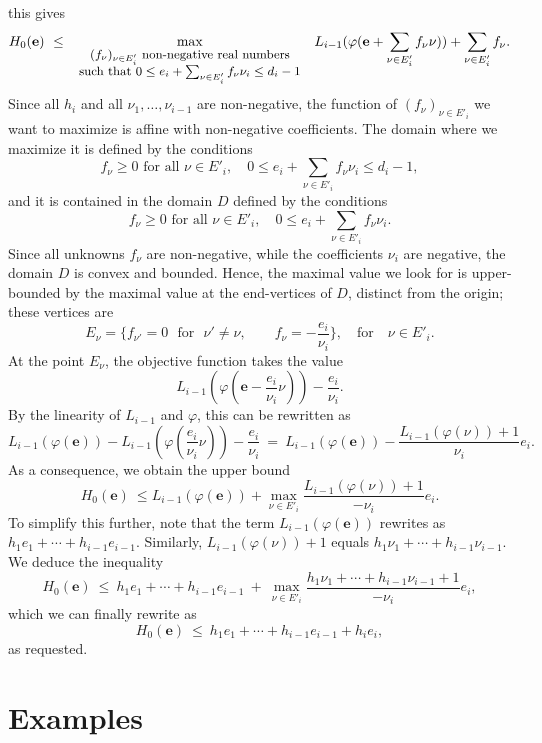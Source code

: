 \documentclass[amsthm]{elsart}
\def\e {\ensuremath{\mathbf{e}}}
\theoremstyle{plain}
\begin{document}
\begin{pf}
this gives
$$H_0(\e) \ \le \ \max_{\small
\begin{array}{c}
(f_\nu)_{\nu \in E'_i} \text{~non-negative real numbers} \\ 
\text{such~that~} 0 \le e_i + \sum_{\nu \in E'_i} f_\nu \nu_i \le d_i-1
\end{array}
}\ L_{i-1}(\varphi(\e + \sum_{\nu \in E'_i} f_\nu \nu))+\sum_{\nu \in
  E'_i} f_\nu.$$ Since all $h_i$ and all $\nu_1,\dots,\nu_{i-1}$ are
non-negative, the function of $(f_\nu)_{\nu \in E'_i}$ we want to
maximize is affine with non-negative coefficients. The domain where we
maximize it is defined by the conditions
$$f_\nu \ge 0 \text{~for all~} \nu \in E'_i, \quad 0 \le  e_i + \sum_{\nu \in E'_i}  f_\nu \nu_i \le d_i-1,$$
and it is contained in the domain $D$ defined by the conditions
$$f_\nu \ge 0 \text{~for all~} \nu \in E'_i, \quad 0 \le e_i + \sum_{\nu \in E'_i}  f_\nu \nu_i.$$
Since all unknowns $f_\nu$ are non-negative, while the coefficients
$\nu_i$ are negative, the domain $D$ is convex and bounded. Hence, the
maximal value we look for is upper-bounded by the maximal value at the
end-vertices of $D$, distinct from the origin; these vertices are 
$$E_\nu = \{f_{\nu'} = 0 \text{~~for~~} \nu'\ne \nu,\qquad f_\nu = -\frac{e_i}{\nu_i}\},
\quad\text{for}\quad \nu\in E'_i.$$ At the point $E_\nu$, the
objective function  takes the value
$$ L_{i-1}(\varphi(\e - \frac{e_i}{\nu_i} \nu))  -\frac{e_i}{\nu_i}.$$
By the linearity of $L_{i-1}$ and $\varphi$, this can be rewritten as
$$  L_{i-1}(\varphi(\e)) - L_{i-1}(\varphi(\frac{e_i}{\nu_i} \nu))-\frac{e_i}{\nu_i}\ =\ 
L_{i-1}(\varphi(\e)) - \frac{L_{i-1}(\varphi(\nu))+1}{\nu_i} e_i.$$
As a consequence, we obtain the upper bound
$$H_0(\e) \ \le L_{i-1}(\varphi(\e)) + \max_{\nu \in E'_i}  \frac{L_{i-1}(\varphi(\nu))+1}{-\nu_i} e_i.$$
To simplify this further, note that the term $L_{i-1}(\varphi(\e))$
rewrites as $h_1 e_1 + \cdots + h_{i-1} e_{i-1}$.  Similarly,
$L_{i-1}(\varphi(\nu))+1$ equals $h_1 \nu_1 + \cdots + h_{i-1} \nu_{i-1}$.
We deduce the inequality
$$H_0(\e) \ \le\ h_1 e_1 + \cdots + h_{i-1} e_{i-1} \ + \
\max_{\nu \in E'_i}  \frac{h_1 \nu_1 + \cdots + h_{i-1} \nu_{i-1}+1}{-\nu_i} e_i,
$$
which we can finally rewrite as 
$$H_0(\e) \ \le\ h_1 e_1 + \cdots + h_{i-1} e_{i-1} + h_i e_i,$$
as requested.
\end{pf}



\section{Examples}\label{sec:appli}
\end{document}
